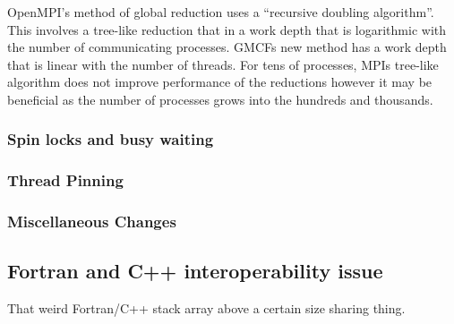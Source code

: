 OpenMPI's method of global reduction uses a ``recursive doubling algorithm''.
This involves a tree-like reduction that in a work depth that is logarithmic
with the number of communicating processes. GMCFs new method has a work depth
that is linear with the number of threads. For tens of processes, MPIs tree-like
algorithm does not improve performance of the reductions however it may be
beneficial as the number of processes grows into the hundreds and thousands.

\subsubsection{Spin locks and busy waiting}

\subsubsection{Thread Pinning}

\subsubsection{Miscellaneous Changes}

\subsection{Fortran and C++ interoperability issue}
\label{sec:fortrancppinteroperability}

That weird Fortran/C++ stack array above a certain size sharing thing.
